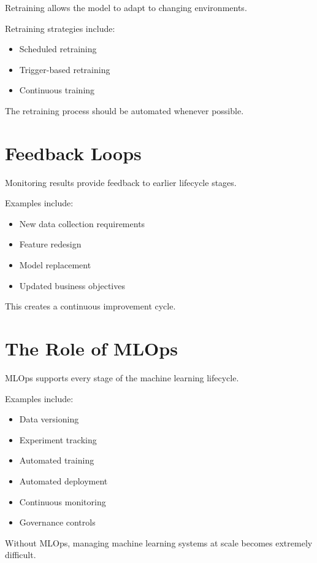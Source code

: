 Retraining allows the model to adapt to changing environments.

Retraining strategies include:

\begin{itemize}
    \item Scheduled retraining
    \item Trigger-based retraining
    \item Continuous training
\end{itemize}

The retraining process should be automated whenever possible.

\section{Feedback Loops}

Monitoring results provide feedback to earlier lifecycle stages.

Examples include:

\begin{itemize}
    \item New data collection requirements
    \item Feature redesign
    \item Model replacement
    \item Updated business objectives
\end{itemize}

This creates a continuous improvement cycle.

\section{The Role of MLOps}

MLOps supports every stage of the machine learning lifecycle.

Examples include:

\begin{itemize}
    \item Data versioning
    \item Experiment tracking
    \item Automated training
    \item Automated deployment
    \item Continuous monitoring
    \item Governance controls
\end{itemize}

Without MLOps, managing machine learning systems at scale becomes extremely difficult.

